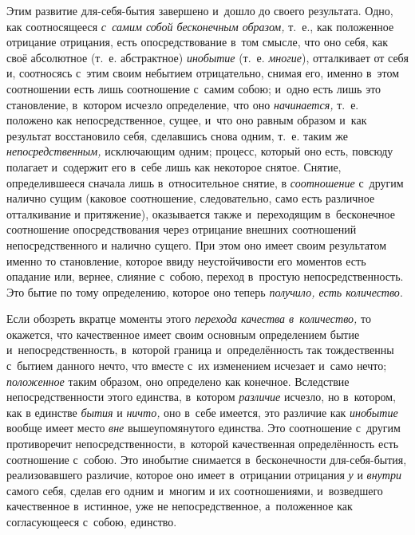 Этим развитие для-себя-бытия завершено и~дошло до своего результата. Одно,
как соотносящееся {\em с~самим собой бесконечным
образом,} т.~е., как положенное отрицание отрицания, есть опосредствование
в~том смысле, что оно себя, как своё абсолютное (т.~е. абстрактное)
{\em инобытие} (т.~е. {\em многие}), отталкивает от себя и, соотносясь с~этим
своим небытием отрицательно, снимая его, именно в~этом соотношении есть
лишь соотношение с~самим собою; и~одно есть лишь это становление, в~котором
исчезло определение, что оно {\em начинается,} т.~е.
положено как непосредственное, сущее, и~что оно равным образом и~как
результат восстановило себя, сделавшись снова одним, т.~е. таким же
{\em непосредственным,} исключающим одним; процесс,
который оно есть, повсюду полагает и~содержит его в~себе лишь как некоторое
снятое. Снятие, определившееся сначала лишь в~относительное снятие, в
{\em соотношение} с~другим налично сущим (каковое
соотношение, следовательно, само есть различное отталкивание и
притяжение), оказывается также и~переходящим в~бесконечное соотношение
опосредствования через отрицание внешних соотношений непосредственного и
налично сущего. При этом оно имеет своим результатом именно то становление,
которое ввиду неустойчивости его моментов есть опадание или, вернее,
слияние с~собою, переход в~простую непосредственность. Это бытие по тому
определению, которое оно теперь {\em получило, есть количество}.

Если обозреть вкратце моменты этого {\em перехода
качества в~количество,} то окажется, что качественное имеет своим основным
определением бытие и~непосредственность, в~которой граница и~определённость
так тождественны с~бытием данного нечто, что вместе с~их изменением
исчезает и~само нечто; {\em положенное} таким образом,
оно определено как конечное. Вследствие непосредственности этого единства,
в~котором {\em различие} исчезло, но в~котором, как в
единстве {\em бытия} и {\em ничто,}
оно в~себе имеется, это различие как {\em инобытие}
вообще имеет место {\em вне} вышеупомянутого единства.
Это соотношение с~другим противоречит непосредственности, в~которой
качественная определённость есть соотношение с~собою. Это инобытие
снимается в~бесконечности для-себя-бытия, реализовавшего различие, которое
оно имеет в~отрицании отрицания {\em у} и
{\em внутри} самого себя, сделав его одним и~многим и
их соотношениями, и~возведшего качественное в~истинное, уже не
непосредственное, а~положенное как согласующееся с~собою, единство.

